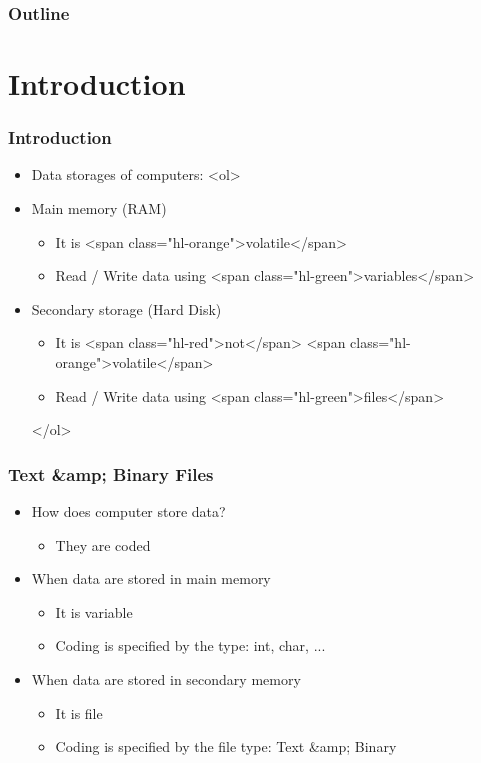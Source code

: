 \documentclass{../c-lecture}
\subtitle{Files}
\begin{document}
\begin{frame}
  \titlepage{}
\end{frame}
\begin{frame}
  \frametitle{Outline}
  \tableofcontents{}
\end{frame}

\section{Introduction}

\begin{frame}
  \frametitle{Introduction}
  \begin{itemize}
    \item Data storages of computers:
    <ol>
      \item Main memory (RAM)
      \begin{itemize}
        \item It is <span class="hl-orange">volatile</span>
        \item Read / Write data using <span class="hl-green">variables</span>
      \end{itemize}
      \item Secondary storage (Hard Disk)
      \begin{itemize}
        \item
          It is <span class="hl-red">not</span>
          <span class="hl-orange">volatile</span>

        \item Read / Write data using <span class="hl-green">files</span>
      \end{itemize}
    </ol>
  \end{itemize}
\end{frame}
\begin{frame}
  \frametitle{Text &amp; Binary Files}
  \begin{itemize}
    \item How does computer store data?
    \begin{itemize}
      \item They are coded
    \end{itemize}
    \item When data are stored in main memory
    \begin{itemize}
      \item It is variable
      \item Coding is specified by the type: int, char, ...
    \end{itemize}
    \item When data are stored in secondary memory
    \begin{itemize}
      \item It is file
      \item Coding is specified by the file type: Text &amp; Binary
    \end{itemize}
  \end{itemize}
\end{frame}
\end{document}
